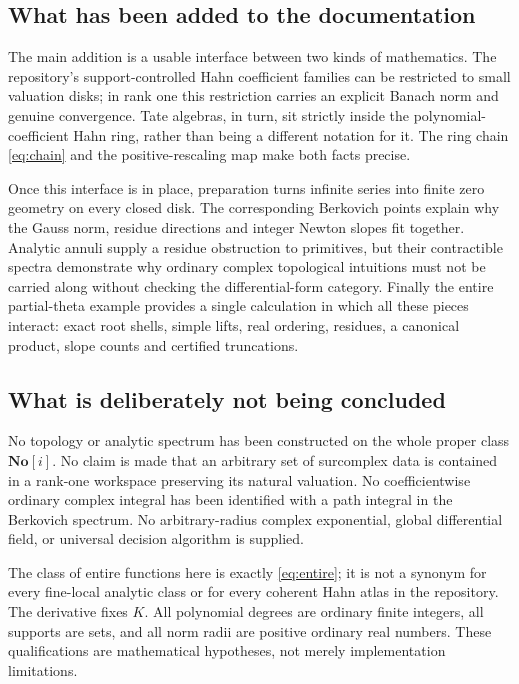 \documentclass[11pt,a4paper]{article}
\numberwithin{equation}{section}
\theoremstyle{definition}
\theoremstyle{remark}
\newcommand{\No}{\mathbf{No}}
\begin{document}
\subsection{What has been added to the documentation}
The main addition is a usable interface between two kinds of mathematics. The
repository's support-controlled Hahn coefficient families can be restricted to
small valuation disks; in rank one this restriction carries an explicit Banach
norm and genuine convergence. Tate algebras, in turn, sit strictly inside the
polynomial-coefficient Hahn ring, rather than being a different notation for it.
The ring chain \eqref{eq:chain} and the positive-rescaling map make both facts
precise.

Once this interface is in place, preparation turns infinite series into finite
zero geometry on every closed disk. The corresponding Berkovich points explain
why the Gauss norm, residue directions and integer Newton slopes fit together.
Analytic annuli supply a residue obstruction to primitives, but their
contractible spectra demonstrate why ordinary complex topological intuitions
must not be carried along without checking the differential-form category.
Finally the entire partial-theta example provides a single calculation in which
all these pieces interact: exact root shells, simple lifts, real ordering,
residues, a canonical product, slope counts and certified truncations.

\subsection{What is deliberately not being concluded}
No topology or analytic spectrum has been constructed on the whole proper class
$\No[i]$. No claim is made that an arbitrary set of surcomplex data is contained
in a rank-one workspace preserving its natural valuation. No coefficientwise
ordinary complex integral has been identified with a path integral in the
Berkovich spectrum. No arbitrary-radius complex exponential, global differential
field, or universal decision algorithm is supplied.

The class of entire functions here is exactly \eqref{eq:entire}; it is not a
synonym for every fine-local analytic class or for every coherent Hahn atlas in
the repository. The derivative fixes $K$. All polynomial degrees are ordinary
finite integers, all supports are sets, and all norm radii are positive ordinary
real numbers. These qualifications are mathematical hypotheses, not merely
implementation limitations.
\end{document}

